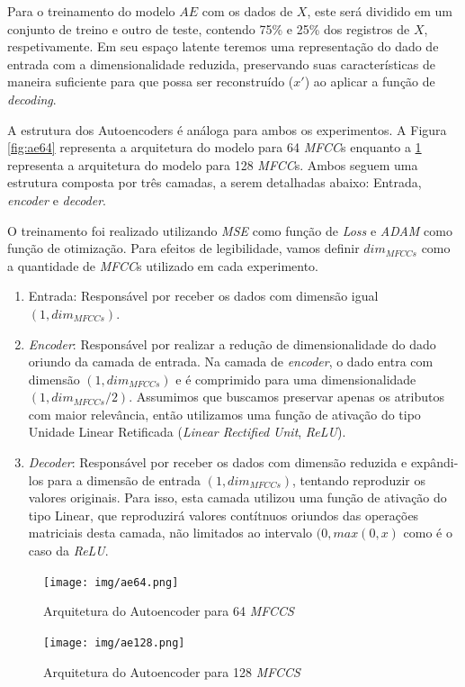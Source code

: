 Para o treinamento do modelo $AE$ com os dados de $X$, este será dividido em um conjunto de treino e outro de teste, contendo 75\% e 25\% dos registros de $X$, respetivamente. Em seu espaço latente teremos uma representação do dado de entrada com a dimensionalidade reduzida, preservando suas características de maneira suficiente para que possa ser reconstruído ($x'$) ao aplicar a função de \textit{decoding}.

A estrutura dos Autoencoders é análoga para ambos os experimentos. A Figura \ref{fig:ae64} representa a arquitetura do modelo para 64 \textit{MFCC}s enquanto a \ref{fig:ae128} representa a arquitetura do modelo para 128 \textit{MFCC}s. Ambos seguem uma estrutura composta por três camadas, a serem detalhadas abaixo: Entrada, \textit{encoder} e \textit{decoder}.

O treinamento foi realizado utilizando \textit{MSE} como função de \textit{Loss} e \textit{ADAM} como função de otimização. Para efeitos de legibilidade, vamos definir $dim_{MFCCs}$ como a quantidade de \textit{MFCC}s utilizado em cada experimento.

\begin{enumerate}
    \item Entrada: Responsável por receber os dados com dimensão igual $(1, dim_{MFCCs})$.
    \item \textit{Encoder}: Responsável por realizar a redução de dimensionalidade do dado oriundo da camada de entrada. Na camada de \textit{encoder}, o dado entra com dimensão $(1, dim_{MFCCs})$ e é comprimido para uma dimensionalidade $(1, dim_{MFCCs}/2)$. Assumimos que buscamos preservar apenas os atributos com maior relevância, então utilizamos uma função de ativação do tipo Unidade Linear Retificada (\textit{Linear Rectified Unit}, \textit{ReLU}).
    \item \textit{Decoder}: Responsável por receber os dados com dimensão reduzida e expândi-los para a dimensão de entrada $(1, dim_{MFCCs})$, tentando reproduzir os valores originais. Para isso, esta camada utilizou uma função de ativação do tipo Linear, que reproduzirá valores contítnuos oriundos das operações matriciais desta camada, não limitados ao intervalo $(0, max(0, x)$ como é o caso da \textit{ReLU}.
\end{enumerate}

\begin{figure}[h]
    \centering
    \begin{minipage}[b]{0.4\linewidth}
        \centering
        \texttt{[image: img/ae64.png]}
        \caption{\label{fig:ae64}Arquitetura do Autoencoder para 64 \textit{MFCCS}}
    \end{minipage}
    \begin{minipage}[b]{0.4\linewidth}
        \centering
        \texttt{[image: img/ae128.png]}
        \caption{\label{fig:ae128}Arquitetura do Autoencoder para 128 \textit{MFCCS}}
    \end{minipage}
\end{figure}


